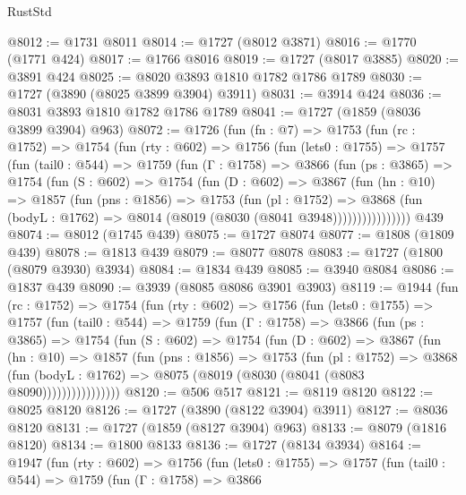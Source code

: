 \begin{lexlean}{RustStd}
\begin{coremodule}
@8012 := @1731 @8011
@8014 := @1727 (@8012 @3871)
@8016 := @1770 (@1771 @424)
@8017 := @1766 @8016
@8019 := @1727 (@8017 @3885)
@8020 := @3891 @424
@8025 := @8020 @3893 @1810 @1782 @1786 @1789
@8030 := @1727 (@3890 (@8025 @3899 @3904) @3911)
@8031 := @3914 @424
@8036 := @8031 @3893 @1810 @1782 @1786 @1789
@8041 := @1727 (@1859 (@8036 @3899 @3904) @963)
@8072 := @1726
    (fun (fn : @7) =>
    @1753
      (fun (rc : @1752) =>
      @1754
        (fun (rty : @602) =>
        @1756
          (fun (lets0 : @1755) =>
          @1757
            (fun (tail0 : @544) =>
            @1759
              (fun (Γ : @1758) =>
              @3866
                (fun (ps : @3865) =>
                @1754
                  (fun (S : @602) =>
                  @1754
                    (fun (D : @602) =>
                    @3867
                      (fun (hn : @10) =>
                      @1857
                        (fun (pns : @1856) =>
                        @1753
                          (fun (pl : @1752) =>
                          @3868
                            (fun (bodyL : @1762) => @8014 (@8019 (@8030 (@8041 @3948))))))))))))))))
    @439
@8074 := @8012 (@1745 @439)
@8075 := @1727 @8074
@8077 := @1808 (@1809 @439)
@8078 := @1813 @439
@8079 := @8077 @8078
@8083 := @1727 (@1800 (@8079 @3930) @3934)
@8084 := @1834 @439
@8085 := @3940 @8084
@8086 := @1837 @439
@8090 := @3939 (@8085 @8086 @3901 @3903)
@8119 := @1944
    (fun (rc : @1752) =>
    @1754
      (fun (rty : @602) =>
      @1756
        (fun (lets0 : @1755) =>
        @1757
          (fun (tail0 : @544) =>
          @1759
            (fun (Γ : @1758) =>
            @3866
              (fun (ps : @3865) =>
              @1754
                (fun (S : @602) =>
                @1754
                  (fun (D : @602) =>
                  @3867
                    (fun (hn : @10) =>
                    @1857
                      (fun (pns : @1856) =>
                      @1753
                        (fun (pl : @1752) =>
                        @3868
                          (fun (bodyL : @1762) =>
                          @8075 (@8019 (@8030 (@8041 (@8083 @8090))))))))))))))))
@8120 := @506 @517
@8121 := @8119 @8120
@8122 := @8025 @8120
@8126 := @1727 (@3890 (@8122 @3904) @3911)
@8127 := @8036 @8120
@8131 := @1727 (@1859 (@8127 @3904) @963)
@8133 := @8079 (@1816 @8120)
@8134 := @1800 @8133
@8136 := @1727 (@8134 @3934)
@8164 := @1947
    (fun (rty : @602) =>
    @1756
      (fun (lets0 : @1755) =>
      @1757
        (fun (tail0 : @544) =>
        @1759
          (fun (Γ : @1758) =>
          @3866

\end{coremodule}
\end{lexlean}
